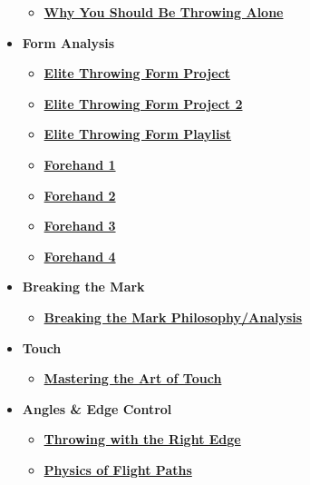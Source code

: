 \begin{itemize}
\begin{itemize}
        \item \textcolor{blue}{\textbf{\href{https://ultiworld.com/2020/03/24/tuesday-tips-throwing-alone/}{Why You Should Be Throwing Alone}}}
    \end{itemize}
    \item \textbf{Form Analysis}
    \begin{itemize}
        \item \textcolor{blue}{\textbf{\href{https://ultiworld.com/2017/03/24/throwing-form-project-video-archive-elite-throwers-mechanics/}{Elite Throwing Form Project}}}
        \item \textcolor{blue}{\textbf{\href{https://ultiworld.com/2018/12/03/updated-throwing-form-project-video-archive-elite-throwers-mechanics-2/}{Elite Throwing Form Project 2}}}
        \item \textcolor{blue}{\textbf{\href{https://www.youtube.com/watch?v=0YY5RUsMa_I&list=PLvgVvH9p4IEH--1s8tBssk_UbbqMrI-dJ}{Elite Throwing Form Playlist}}}
        \item \textcolor{blue}{\textbf{\href{https://ultiworld.com/2015/05/12/the-forehand-part-i/}{Forehand 1}}}
        \item \textcolor{blue}{\textbf{\href{https://ultiworld.com/2015/06/09/the-forehand-part-two/}{Forehand 2}}}
        \item \textcolor{blue}{\textbf{\href{https://ultiworld.com/2015/06/23/the-forehand-part-3/}{Forehand 3}}}
        \item \textcolor{blue}{\textbf{\href{https://ultiworld.com/2015/07/09/the-forehand-part-four-best-practices/}{Forehand 4}}}
    \end{itemize}
    \item \textbf{Breaking the Mark}
    \begin{itemize}
        \item \textcolor{blue}{\textbf{\href{https://youtu.be/IK9Qzg8P4rs}{Breaking the Mark Philosophy/Analysis}}}
    \end{itemize}
    \item \textbf{Touch}
    \begin{itemize}
        \item \textcolor{blue}{\textbf{\href{https://ultiworld.com/2018/02/13/tuesday-tips-mastering-art-touch-presented-spin-ultimate/}{Mastering the Art of Touch}}}
    \end{itemize}
    \item \textbf{Angles \& Edge Control}
    \begin{itemize}
        \item \textcolor{blue}{\textbf{\href{https://www.youtube.com/watch?v=R9L-mcMUKrs}{Throwing with the Right Edge}}}
        \item \textcolor{blue}{\textbf{\href{https://understandingultimate.wordpress.com/2014/10/27/the-physics-of-flight-paths/}{Physics of Flight Paths}}}
    \end{itemize}
\end{itemize}
